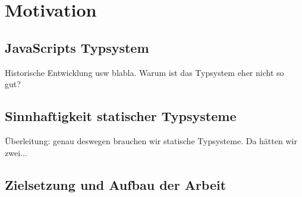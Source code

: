 \chapter{Motivation}

\section{JavaScripts Typsystem}

Historische Entwicklung usw blabla. Warum ist das Typsystem eher nicht so gut?~\autocite{severance:2012:js10days}

\section{Sinnhaftigkeit statischer Typsysteme}

Überleitung: genau deswegen brauchen wir statische Typsysteme. Da hätten wir zwei...

\section{Zielsetzung und Aufbau der Arbeit}
